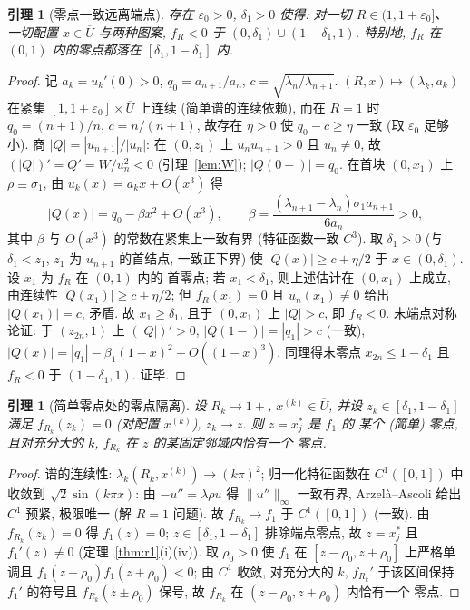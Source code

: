 \documentclass[UTF8]{ctexart}
\newtheorem{lemma}[theorem]{引理}
\begin{document}
\begin{lemma}[零点一致远离端点]\label{lem:away}
存在 $\varepsilon_0>0$, $\delta_1>0$ 使得: 对一切 $R\in(1,1+\varepsilon_0]$、
一切配置 $x\in\overline U$ 与两种图案, $f_R<0$ 于
$(0,\delta_1)\cup(1-\delta_1,1)$. 特别地, $f_R$ 在 $(0,1)$ 内的零点都落在
$[\delta_1,1-\delta_1]$ 内.
\end{lemma}
\begin{proof}
记 $a_k=u_k'(0)>0$, $q_0=a_{n+1}/a_n$, $c=\sqrt{\lambda_n/\lambda_{n+1}}$.
$(R,x)\mapsto(\lambda_k,a_k)$ 在紧集 $[1,1+\varepsilon_0]\times\overline U$ 上连续
(简单谱的连续依赖), 而在 $R=1$ 时 $q_0=(n+1)/n$, $c=n/(n+1)$, 故存在
$\eta>0$ 使 $q_0-c\ge\eta$ 一致 (取 $\varepsilon_0$ 足够小). 商
$|Q|=|u_{n+1}|/|u_n|$: 在 $(0,z_1)$ 上 $u_nu_{n+1}>0$ 且 $u_n\neq0$,
故 $(|Q|)'=Q'=W/u_n^2<0$ (引理~\ref{lem:W}); $|Q(0+)|=q_0$. 在首块
$(0,x_1)$ 上 $\rho\equiv\sigma_1$, 由 $u_k(x)=a_kx+O(x^3)$ 得
\begin{equation*}
	|Q(x)|=q_0-\beta x^2+O(x^3),\qquad
	\beta=\frac{(\lambda_{n+1}-\lambda_n)\sigma_1a_{n+1}}{6a_n}>0,
\end{equation*}
其中 $\beta$ 与 $O(x^3)$ 的常数在紧集上一致有界 (特征函数一致 $C^3$).
取 $\delta_1>0$ (与 $\delta_1<z_1$, $z_1$ 为 $u_{n+1}$ 的首结点, 一致正下界)
使 $|Q(x)|\ge c+\eta/2$ 于 $x\in(0,\delta_1)$. 设 $x_1$ 为 $f_R$ 在 $(0,1)$ 内的
首零点; 若 $x_1<\delta_1$, 则上述估计在 $(0,x_1)$ 上成立, 由连续性
$|Q(x_1)|\ge c+\eta/2$; 但 $f_R(x_1)=0$ 且 $u_n(x_1)\neq0$ 给出
$|Q(x_1)|=c$, 矛盾. 故 $x_1\ge\delta_1$, 且于 $(0,x_1)$ 上 $|Q|>c$, 即
$f_R<0$. 末端点对称论证: 于 $(z_{2n},1)$ 上 $(|Q|)'>0$, $|Q(1-)|=|q_1|>c$
(一致), $|Q(x)|=|q_1|-\beta_1(1-x)^2+O((1-x)^3)$, 同理得末零点
$x_{2n}\le1-\delta_1$ 且 $f_R<0$ 于 $(1-\delta_1,1)$. 证毕.
\end{proof}

\begin{lemma}[简单零点处的零点隔离]\label{lem:isol}
设 $R_k\to1+$, $x^{(k)}\in\overline U$, 并设 $z_k\in[\delta_1,1-\delta_1]$
满足 $f_{R_k}(z_k)=0$ (对配置 $x^{(k)}$), $z_k\to z$. 则 $z=x_j^*$ 是 $f_1$ 的
某个 (简单) 零点, 且对充分大的 $k$, $f_{R_k}$ 在 $z$ 的某固定邻域内恰有一个
零点.
\end{lemma}
\begin{proof}
谱的连续性: $\lambda_k(R_k,x^{(k)})\to(k\pi)^2$; 归一化特征函数在
$C^1([0,1])$ 中收敛到 $\sqrt2\sin(k\pi x)$: 由 $-u''=\lambda\rho u$ 得
$\|u''\|_\infty$ 一致有界, Arzel\`a--Ascoli 给出 $C^1$ 预紧, 极限唯一
(解 $R=1$ 问题). 故 $f_{R_k}\to f_1$ 于 $C^1([0,1])$ (一致).
由 $f_{R_k}(z_k)=0$ 得 $f_1(z)=0$; $z\in[\delta_1,1-\delta_1]$ 排除端点零点,
故 $z=x_j^*$ 且 $f_1'(z)\neq0$ (定理~\ref{thm:r1}(i)(iv)). 取 $\rho_0>0$ 使
$f_1$ 在 $[z-\rho_0,z+\rho_0]$ 上严格单调且 $f_1(z-\rho_0)f_1(z+\rho_0)<0$;
由 $C^1$ 收敛, 对充分大的 $k$, $f_{R_k}'$ 于该区间保持 $f_1'$ 的符号且
$f_{R_k}(z\pm\rho_0)$ 保号, 故 $f_{R_k}$ 在 $(z-\rho_0,z+\rho_0)$ 内恰有一个
零点.
\end{proof}
\end{document}

